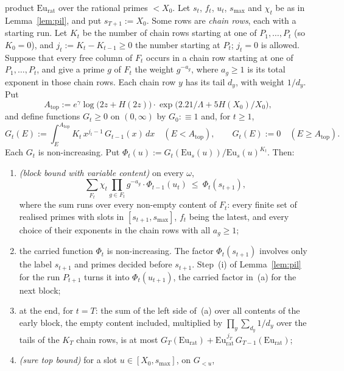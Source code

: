 \begin{lemma}
\begin{enumerate}[label=(\arabic*),leftmargin=*]
  product $\mathrm{Eu}_{\mathrm{rat}}$ over the rational primes $<X_0$. Let $s_t$, $f_t$, $u_t$, $s_{\max}$ and $\chi_t$
  be as in Lemma~\ref{lem:pil}, and put $s_{T+1}:=X_0$. Some rows are \emph{chain rows}, each with a starting run. Let
  $K_t$ be the number of chain rows starting at one of $P_1,\dots,P_t$ (so $K_0=0$), and $j_t:=K_t-K_{t-1}\ge0$ the
  number starting at $P_t$; $j_t=0$ is allowed. Suppose that every free column of $F_t$ occurs in a chain row starting
  at one of $P_1,\dots,P_t$, and give a prime $g$ of $F_t$ the weight $g^{-a_g}$, where $a_g\ge1$ is its total exponent
  in those chain rows. Each chain row $y$ has its tail $d_y$, with weight $1/d_y$. Put
  \[
    A_{\mathrm{top}}:=e^{\gamma}\log\bigl(2z+H(2z)\bigr)\cdot\exp\bigl(2.21/\Lambda+5H(X_0)/X_0\bigr),
  \]
  and define functions $G_t\ge0$ on $(0,\infty)$ by $G_0:\equiv1$ and, for $t\ge1$,
  \begin{equation}\label{eq:A-Grec}
    G_t(E):=\int_E^{A_{\mathrm{top}}}K_t\,x^{j_t-1}\,G_{t-1}(x)\,dx\quad(E<A_{\mathrm{top}}),\qquad
    G_t(E):=0\quad(E\ge A_{\mathrm{top}}).
  \end{equation}
  Each $G_t$ is non-increasing. Put $\Phi_t(u):=G_t(\mathrm{Eu}_s(u))/\mathrm{Eu}_s(u)^{K_t}$. Then:
  \begin{enumerate}[label=(\alph*)]
  \item \emph{(block bound with variable content)} on every $\omega$,
    \[
      \sum_{F_t}\chi_t\prod_{g\in F_t}g^{-a_g}\cdot\Phi_{t-1}(u_t)\ \le\ \Phi_t(s_{t+1}),
    \]
    where the sum runs over every non-empty content of $F_t$: every finite set of realised primes with slots in
    $[s_{t+1},s_{\max}]$, $f_t$ being the latest, and every choice of their exponents in the chain rows with all
    $a_g\ge1$;
  \item the carried function $\Phi_t$ is non-increasing. The factor $\Phi_t(s_{t+1})$ involves only the label $s_{t+1}$
    and primes decided before $s_{t+1}$. Step~(i) of Lemma~\ref{lem:pil} for the run $P_{t+1}$ turns it into
    $\Phi_t(u_{t+1})$, the carried factor in~(a) for the next block;
  \item at the end, for $t=T$: the sum of the left side of~(a) over all contents of the early block, the empty content
    included, multiplied by $\prod_y\sum_{d_y}1/d_y$ over the tails of the $K_T$ chain rows, is at most
    $G_T(\mathrm{Eu}_{\mathrm{rat}})+\mathrm{Eu}_{\mathrm{rat}}^{\,j_T}\,G_{T-1}(\mathrm{Eu}_{\mathrm{rat}})$;
  \item \emph{(sure top bound)} for a slot $u\in[X_0,s_{\max}]$, on $G_{<u}$,

\end{enumerate}
\end{enumerate}
\end{lemma}
